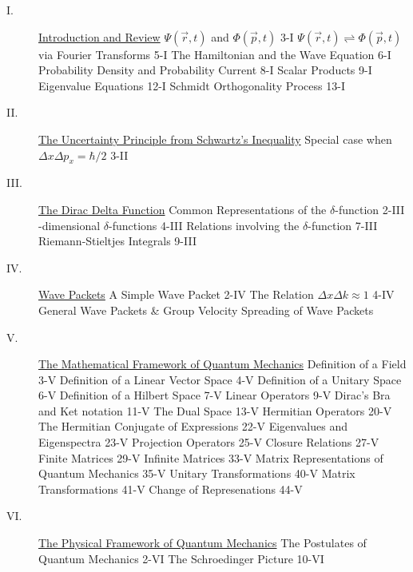 \documentclass[epsf]{article}
\begin{document}
\begin{description}
\item[I.] \underline{Introduction and Review}
\subitem $\Psi(\vec r, t)$ and $\Phi(\vec p, t)$ \hfill 3-I
\subitem $\Psi(\vec r, t) \rightleftharpoons \Phi(\vec p, t)$ via Fourier Transforms \hfill 5-I
\subitem The Hamiltonian and the Wave Equation \hfill 6-I
\subitem Probability Density and Probability Current \hfill 8-I
\subitem Scalar Products \hfill 9-I
\subitem Eigenvalue Equations \hfill 12-I
\subitem Schmidt Orthogonality Process \hfill 13-I

\item[II.] \underline{The Uncertainty Principle from Schwartz's Inequality}
\subitem Special case when $\Delta x \Delta p_x =\hbar/2$ \hfill 3-II

\item[III.] \underline{The Dirac Delta Function}
\subitem Common Representations of the $\delta$-function \hfill 2-III
-dimensional $\delta$-functions \hfill 4-III
\subitem Relations involving the $\delta$-function \hfill 7-III
\subitem Riemann-Stieltjes Integrals \hfill 9-III

\item[IV.] \underline{Wave Packets}
\subitem A Simple Wave Packet \hfill 2-IV
\subitem The Relation $\Delta x \Delta k \approx 1$ \hfill 4-IV
\subitem General Wave Packets \& Group Velocity
\subitem Spreading of Wave Packets

\item[V.] \underline{The Mathematical Framework of Quantum Mechanics}
\subitem Definition of a Field \hfill 3-V
\subitem Definition of a Linear Vector Space \hfill 4-V
\subitem Definition of a Unitary Space \hfill 6-V
\subitem Definition of a Hilbert Space \hfill 7-V
\subitem Linear Operators \hfill 9-V
\subitem Dirac's Bra and Ket notation \hfill 11-V
\subitem The Dual Space \hfill 13-V
\subitem Hermitian Operators \hfill 20-V
\subitem The Hermitian Conjugate of Expressions \hfill 22-V
\subitem Eigenvalues and Eigenspectra \hfill 23-V
\subitem Projection Operators \hfill 25-V
\subitem Closure Relations \hfill 27-V
\subitem Finite Matrices \hfill 29-V
\subitem Infinite Matrices \hfill 33-V
\subitem Matrix Representations of Quantum Mechanics \hfill 35-V
\subitem Unitary Transformations \hfill 40-V
\subitem Matrix Transformations \hfill 41-V
\subitem Change of Represenations \hfill 44-V

\item[VI.] \underline{The Physical Framework of Quantum Mechanics}
\subitem The Postulates of Quantum Mechanics \hfill 2-VI
\subitem The Schroedinger Picture \hfill 10-VI


\end{description}
\end{document}
